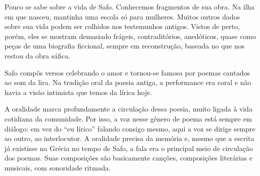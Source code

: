 \documentclass[12pt]{extarticle}
\begin{document}



Pouco se sabe sobre a vida de Safo. Conhecemos fragmentos de sua obra.
Na ilha em que nasceu, mantinha uma escola só para mulheres. Muitos outros 
dados sobre sua vida podem ser colhidos nos testemunhos antigos. 
Vistos de perto, porém, eles se mostram demasiado frágeis,
contraditórios, anedóticos, quase como peças de uma biografia ficcional,
sempre em reconstrução, baseada no que nos restou da obra sáfica.

Safo compôs versos celebrando o amor e tornou-se famosa por poemas
cantados ao som da lira. Na tradição oral da poesia antiga, a
performance era coral e não havia a visão intimista que temos da lírica
hoje.

A oralidade marca profundamente a circulação dessa poesia, muito ligada
à vida cotidiana da comunidade. Por isso, a voz nesse gênero de poema 
está sempre em diálogo: em vez do ``eu lírico'' falando consigo mesmo, 
aqui a voz se dirige sempre ao outro, ao interlocutor. A oralidade precisa 
da memória e, mesmo que a escrita já existisse na Grécia no tempo de Safo, 
a fala era o principal meio de circulação dos poemas. Suas composições são 
basicamente canções, composições literárias e musicais, com sonoridade ritmada. 
\end{document}
